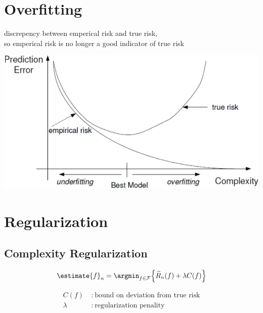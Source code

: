 \documentclass[18pt,a3paper,landscape, ncols=3]{cheatsheet}
\begin{document}
\columnbreak

\section{Overfitting} \seperator
	\begin{mdframed}
		\begin{minipage}{0.3\linewidth}
			discrepency between emperical risk and true risk,\\ so emperical risk is no longer a good indicator of true risk
		\end{minipage}%
		\begin{minipage}{0.7\linewidth}
			\begin{center}
        \centering
        \includegraphics[width=\linewidth]{overfitting.png}
      \end{center}
		\end{minipage}
	\end{mdframed}

\section{Regularization} \seperator
	\subsection{Complexity Regularization}
		\begin{mdframed}
			\begin{minipage}{0.5\linewidth}%
				\[
					\estimate{f}_{n} = \argmin_{f \in \mathcal{F}} \Big\lbrace \widehat{R}_{n}(f) + \lambda C(f) \Big\rbrace
				\]
			\end{minipage}%
			\begin{minipage}{0.5\linewidth}%
				\begin{align*}
					C(f) &\ \colon\ \text{bound on deviation from true risk}\\
					\lambda &\ \colon\ \text{regularization penality}
				\end{align*}
			\end{minipage}
		\end{mdframed}
\end{document}
